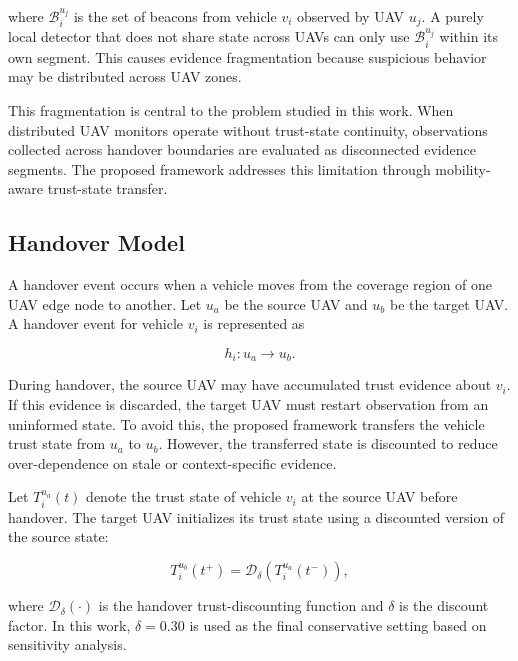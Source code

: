 \documentclass[journal]{IEEEtran}
\begin{document}
where \(\mathcal{B}_i^{u_j}\) is the set of beacons from vehicle \(v_i\) observed by UAV \(u_j\). A purely local detector that does not share state across UAVs can only use \(\mathcal{B}_i^{u_j}\) within its own segment. This causes evidence fragmentation because suspicious behavior may be distributed across UAV zones.

This fragmentation is central to the problem studied in this work. When distributed UAV monitors operate without trust-state continuity, observations collected across handover boundaries are evaluated as disconnected evidence segments. The proposed framework addresses this limitation through mobility-aware trust-state transfer.

\subsection{Handover Model}
\label{subsec:handover_model}

A handover event occurs when a vehicle moves from the coverage region of one UAV edge node to another. Let \(u_a\) be the source UAV and \(u_b\) be the target UAV. A handover event for vehicle \(v_i\) is represented as

\begin{equation}
h_i: u_a \rightarrow u_b.
\label{eq:handover_event}
\end{equation}

During handover, the source UAV may have accumulated trust evidence about \(v_i\). If this evidence is discarded, the target UAV must restart observation from an uninformed state. To avoid this, the proposed framework transfers the vehicle trust state from \(u_a\) to \(u_b\). However, the transferred state is discounted to reduce over-dependence on stale or context-specific evidence.

Let \(T_i^{u_a}(t)\) denote the trust state of vehicle \(v_i\) at the source UAV before handover. The target UAV initializes its trust state using a discounted version of the source state:

\begin{equation}
T_i^{u_b}(t^+) = \mathcal{D}_{\delta}\left(T_i^{u_a}(t^-)\right),
\label{eq:handover_discount}
\end{equation}

where \(\mathcal{D}_{\delta}(\cdot)\) is the handover trust-discounting function and \(\delta\) is the discount factor. In this work, \(\delta=0.30\) is used as the final conservative setting based on sensitivity analysis.
\end{document}

